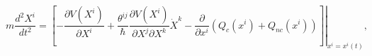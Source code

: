 \begin{equation}
m\frac{d^{2}X^{i}}{dt^{2}}=\left.  \left[  -\frac{\partial V\left(
X^{i}\right)  }{\partial X^{i}}+\frac{\theta^{ij}}{\hbar}\frac{\partial
V\left(  X^{i}\right)  }{\partial X^{j}\partial X^{k}}\dot{X}^{k}%
-\frac{\partial}{\partial x^{i}}\left(  Q_{c}(x^{i})+Q_{nc}(x^{i})\right)
\right]  \right|  _{x^{i}=x^{i}(t)},\label{33}%
\end{equation}

